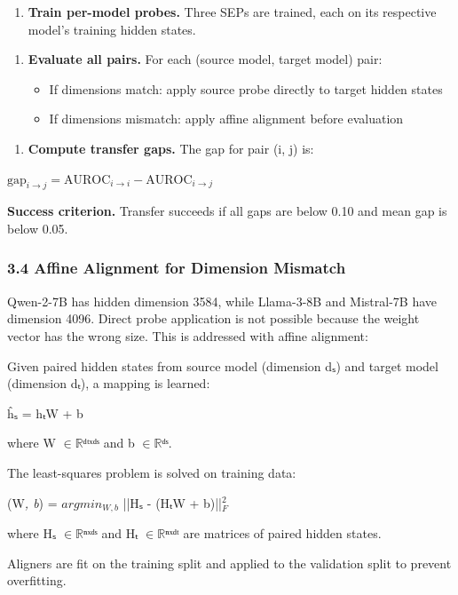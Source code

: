 \begin{enumerate}
\item \textbf{Train per-model probes.} Three SEPs are trained, each on its respective model's training hidden states.
\end{enumerate}

\begin{enumerate}
\item \textbf{Evaluate all pairs.} For each (source model, target model) pair:
\begin{itemize}
\item If dimensions match: apply source probe directly to target hidden states
\item If dimensions mismatch: apply affine alignment before evaluation
\end{itemize}
\end{enumerate}

\begin{enumerate}
\item \textbf{Compute transfer gaps.} The gap for pair (i, j) is:
\end{enumerate}
   $\text{gap}_{i\rightarrow j} = \text{AUROC}_{i\rightarrow i} - \text{AUROC}_{i\rightarrow j}$

\textbf{Success criterion.} Transfer succeeds if all gaps are below 0.10 and mean gap is below 0.05.

\subsubsection{3.4 Affine Alignment for Dimension Mismatch}

Qwen-2-7B has hidden dimension 3584, while Llama-3-8B and Mistral-7B have dimension 4096. Direct probe application is not possible because the weight vector has the wrong size. This is addressed with affine alignment:

Given paired hidden states from source model (dimension dₛ) and target model (dimension dₜ), a mapping is learned:

ĥₛ = hₜW + b

where W $\in \mathbb{R}$ᵈᵗˣᵈˢ and b $\in \mathbb{R}$ᵈˢ.

The least-squares problem is solved on training data:

(W\textit{, b}) = $argmin_{W,b}$ ||Hₛ - (HₜW + b)||$^{2}_F$

where Hₛ $\in \mathbb{R}$ⁿˣᵈˢ and Hₜ $\in \mathbb{R}$ⁿˣᵈᵗ are matrices of paired hidden states.

Aligners are fit on the training split and applied to the validation split to prevent overfitting.

